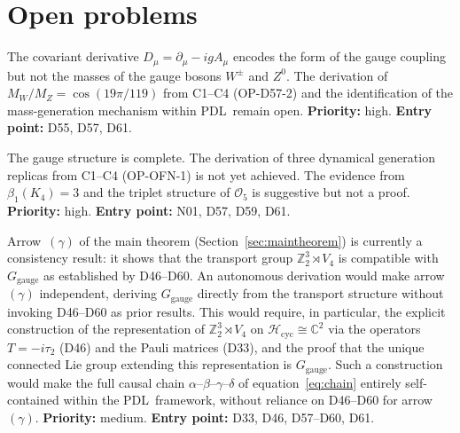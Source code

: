 \documentclass[11pt,a4paper]{article}
\newenvironment{openproblem}[1][]{%
  \begin{tcolorbox}[openproblemstyle,title={Open Problem%
    \ifx\relax#1\relax\else: #1\fi}]}{\end{tcolorbox}}
\theoremstyle{plain}
\theoremstyle{definition}
\theoremstyle{remark}
\newcommand{\PDL}{\textsc{PDL}}
\newcommand{\Kfour}{K_4}
\newcommand{\Vfour}{V_4}
\newcommand{\Ggauge}{G_{\mathrm{gauge}}}
\newcommand{\Hcyc}{\mathcal{H}_{\mathrm{cyc}}}
\newcommand{\Dmu}{D_\mu}
\begin{document}
\section{Open problems}
\label{sec:open}

\begin{openproblem}[OP-D61-1 --- Gauge boson masses]
The covariant derivative $\Dmu = \partial_\mu - igA_\mu$ encodes the form of the
gauge coupling but not the masses of the gauge bosons $W^\pm$ and $Z^0$.
The derivation of $M_W/M_Z = \cos(19\pi/119)$ from C1--C4 (OP-D57-2) and the
identification of the mass-generation mechanism within \PDL\ remain open.
\textbf{Priority:} high. \textbf{Entry point:} D55, D57, D61.
\end{openproblem}

\begin{openproblem}[OP-D61-2 --- Three fermion generations]
The gauge structure is complete. The derivation of three dynamical generation
replicas from C1--C4 (OP-OFN-1) is not yet achieved. The evidence from
$\beta_1(\Kfour) = 3$ and the triplet structure of $\mathcal{O}_5$ is suggestive
but not a proof. \textbf{Priority:} high. \textbf{Entry point:} N01, D57, D59,
D61.
\end{openproblem}

\begin{openproblem}[OP-D61-3 --- Autonomous derivation of $\Ggauge$ from the transport structure]
Arrow~$(\gamma)$ of the main theorem (Section~\ref{sec:maintheorem}) is currently
a consistency result: it shows that the transport group $\mathbb{Z}_2^3 \rtimes \Vfour$
is compatible with $\Ggauge$ as established by D46--D60. An autonomous derivation
would make arrow~$(\gamma)$ independent, deriving $\Ggauge$ directly from the
transport structure without invoking D46--D60 as prior results. This would require,
in particular, the explicit construction of the representation of
$\mathbb{Z}_2^3 \rtimes \Vfour$ on $\Hcyc \cong \mathbb{C}^2$ via the operators
$T = -i\tau_2$ (D46) and the Pauli matrices (D33), and the proof that the unique
connected Lie group extending this representation is $\Ggauge$. Such a construction
would make the full causal chain $\alpha$--$\beta$--$\gamma$--$\delta$ of
equation~\eqref{eq:chain} entirely self-contained within the \PDL\ framework, without
reliance on D46--D60 for arrow~$(\gamma)$.
\textbf{Priority:} medium. \textbf{Entry point:} D33, D46, D57--D60, D61.
\end{openproblem}
\end{document}
